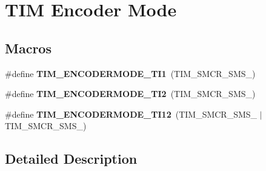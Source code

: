 \hypertarget{group___t_i_m___encoder___mode}{}\section{T\+IM Encoder Mode}
\label{group___t_i_m___encoder___mode}
\subsection*{Macros}
\begin{DoxyCompactItemize}
\item 
\mbox{\label{group___t_i_m___encoder___mode_gaff047abefa78b0f0a7bbd0f648905d7d}} 
\#define {\bfseries T\+I\+M\+\_\+\+E\+N\+C\+O\+D\+E\+R\+M\+O\+D\+E\+\_\+\+T\+I1}~(T\+I\+M\+\_\+\+S\+M\+C\+R\+\_\+\+S\+M\+S\+\_)
\item 
\mbox{\label{group___t_i_m___encoder___mode_ga9166e985a35358cb3ed942c2a36e018d}} 
\#define {\bfseries T\+I\+M\+\_\+\+E\+N\+C\+O\+D\+E\+R\+M\+O\+D\+E\+\_\+\+T\+I2}~(T\+I\+M\+\_\+\+S\+M\+C\+R\+\_\+\+S\+M\+S\+\_)
\item 
\mbox{\label{group___t_i_m___encoder___mode_ga8046f1021dc578551fcff88891239e67}} 
\#define {\bfseries T\+I\+M\+\_\+\+E\+N\+C\+O\+D\+E\+R\+M\+O\+D\+E\+\_\+\+T\+I12}~(T\+I\+M\+\_\+\+S\+M\+C\+R\+\_\+\+S\+M\+S\+\_ $\vert$ T\+I\+M\+\_\+\+S\+M\+C\+R\+\_\+\+S\+M\+S\+\_)
\end{DoxyCompactItemize}


\subsection{Detailed Description}
